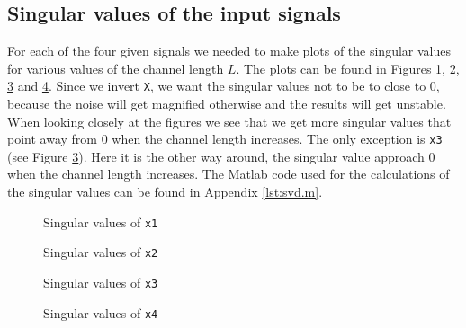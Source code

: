 \documentclass[final]{scrreprt} %
\begin{document}
\subsection{Singular values of the input signals}

For each of the four given signals we needed to make plots of the singular values for various values of the channel length $L$. 
The plots can be found in Figures \ref{fig:svd1}, \ref{fig:svd2}, \ref{fig:svd3} and \ref{fig:svd4}. 
Since we invert \texttt{X}, we want the singular values not to be to close to 0, because the noise will get magnified otherwise and the results will get unstable. 
\\
When looking closely at the figures we see that we get more singular values that point away from 0 when the channel length increases. 
The only exception is \texttt{x3} (see Figure \ref{fig:svd3}).
Here it is the other way around, the singular value approach 0 when the channel length increases. 
The Matlab code used for the calculations of the singular values can be found in Appendix \ref{lst:svd.m}.


\begin{figure}[H]
	\centering
    	\setlength\figureheight{6cm}
    	\setlength\figurewidth{10cm}
    	    	
    	\caption{Singular values of \texttt{x1}}
    	\label{fig:svd1}
\end{figure}

\begin{figure}[H]
	\centering
    	\setlength\figureheight{6cm}
    	\setlength\figurewidth{10cm}
    	    	
    	\caption{Singular values of \texttt{x2}}
    	\label{fig:svd2}
\end{figure}

\begin{figure}[H]
	\centering
    	\setlength\figureheight{6cm}
    	\setlength\figurewidth{10cm}
    	    	
    	\caption{Singular values of \texttt{x3}}
    	\label{fig:svd3}
\end{figure}

\begin{figure}[H]
	\centering
    	\setlength\figureheight{6cm}
    	\setlength\figurewidth{10cm}
    	    	
    	\caption{Singular values of \texttt{x4}}
    	\label{fig:svd4}
\end{figure}
\end{document}
